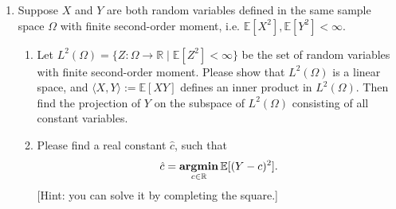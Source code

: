 \documentclass[11pt,letter,notitlepage]{article}
\DeclareMathOperator*{\argmin}{\bf argmin}
\begin{document}
\newpage
    \begin{exercise}

        \begin{enumerate}



            \item Suppose $X$ and $Y$ are both random variables defined in the same sample space $\Omega$ with finite second-order moment, i.e. $\mathbb{E}[X^2], \mathbb{E}[Y^2]<\infty$.
            \begin{enumerate}
                \item Let $L^2(\Omega)=\{Z:\Omega\to\mathbb{R}\mid \mathbb{E}[Z^2]<\infty\}$ be the set of random variables with finite second-order moment. Please show that $L^2(\Omega)$ is a linear space, and $\langle X,Y \rangle:=\mathbb{E}[X Y]$ defines an inner product in $L^2(\Omega)$. Then find the projection of $Y$ on the subspace of $L^2(\Omega)$ consisting of all constant variables.
                \item Please find a real constant $\hat{c}$, such that
                \begin{align*}
                    \hat{c}=\argmin_{c\in \mathbb{R}}\mathbb{E}[(Y-c)^2].
                \end{align*}
                [Hint: you can solve it by completing the square.]


\end{enumerate}
\end{enumerate}
\end{exercise}
\end{document}
